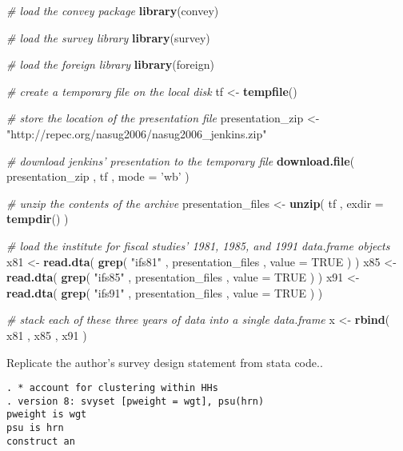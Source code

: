 \documentclass[]{book}
\newenvironment{Shaded}{\begin{snugshade}}{\end{snugshade}}
\newcommand{\CommentTok}[1]{\textcolor[rgb]{0.56,0.35,0.01}{\textit{#1}}}
\newcommand{\DataTypeTok}[1]{\textcolor[rgb]{0.13,0.29,0.53}{#1}}
\newcommand{\KeywordTok}[1]{\textcolor[rgb]{0.13,0.29,0.53}{\textbf{#1}}}
\newcommand{\NormalTok}[1]{#1}
\newcommand{\OtherTok}[1]{\textcolor[rgb]{0.56,0.35,0.01}{#1}}
\newcommand{\StringTok}[1]{\textcolor[rgb]{0.31,0.60,0.02}{#1}}
\begin{document}
\begin{Shaded}
\begin{Highlighting}[]
\CommentTok{# load the convey package}
\KeywordTok{library}\NormalTok{(convey)}

\CommentTok{# load the survey library}
\KeywordTok{library}\NormalTok{(survey)}

\CommentTok{# load the foreign library}
\KeywordTok{library}\NormalTok{(foreign)}

\CommentTok{# create a temporary file on the local disk}
\NormalTok{tf <-}\StringTok{ }\KeywordTok{tempfile}\NormalTok{()}

\CommentTok{# store the location of the presentation file}
\NormalTok{presentation_zip <-}\StringTok{ "http://repec.org/nasug2006/nasug2006_jenkins.zip"}

\CommentTok{# download jenkins' presentation to the temporary file}
\KeywordTok{download.file}\NormalTok{( presentation_zip , tf , }\DataTypeTok{mode =} \StringTok{'wb'}\NormalTok{ )}

\CommentTok{# unzip the contents of the archive}
\NormalTok{presentation_files <-}\StringTok{ }\KeywordTok{unzip}\NormalTok{( tf , }\DataTypeTok{exdir =} \KeywordTok{tempdir}\NormalTok{() )}

\CommentTok{# load the institute for fiscal studies' 1981, 1985, and 1991 data.frame objects}
\NormalTok{x81 <-}\StringTok{ }\KeywordTok{read.dta}\NormalTok{( }\KeywordTok{grep}\NormalTok{( }\StringTok{"ifs81"}\NormalTok{ , presentation_files , }\DataTypeTok{value =} \OtherTok{TRUE}\NormalTok{ ) )}
\NormalTok{x85 <-}\StringTok{ }\KeywordTok{read.dta}\NormalTok{( }\KeywordTok{grep}\NormalTok{( }\StringTok{"ifs85"}\NormalTok{ , presentation_files , }\DataTypeTok{value =} \OtherTok{TRUE}\NormalTok{ ) )}
\NormalTok{x91 <-}\StringTok{ }\KeywordTok{read.dta}\NormalTok{( }\KeywordTok{grep}\NormalTok{( }\StringTok{"ifs91"}\NormalTok{ , presentation_files , }\DataTypeTok{value =} \OtherTok{TRUE}\NormalTok{ ) )}

\CommentTok{# stack each of these three years of data into a single data.frame}
\NormalTok{x <-}\StringTok{ }\KeywordTok{rbind}\NormalTok{( x81 , x85 , x91 )}
\end{Highlighting}
\end{Shaded}

Replicate the author's survey design statement from stata code..

\begin{verbatim}
. * account for clustering within HHs 
. version 8: svyset [pweight = wgt], psu(hrn)
pweight is wgt
psu is hrn
construct an
\end{verbatim}
\end{document}
